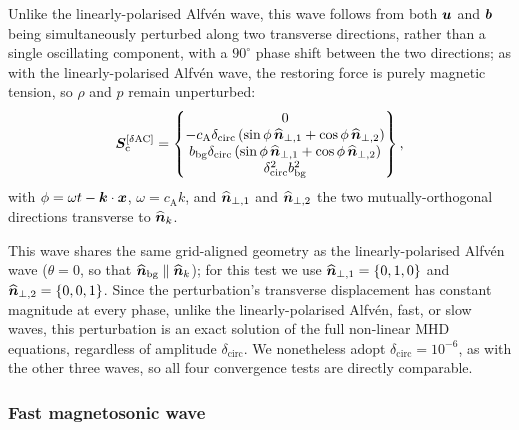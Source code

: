 Unlike the linearly-polarised Alfv\'en wave, this wave follows from both $\bm{u}$ and $\bm{b}$ being simultaneously perturbed along two transverse directions, rather than a single oscillating component, with a $90^\circ$ phase shift between the two directions; as with the linearly-polarised Alfv\'en wave, the restoring force is purely magnetic tension, so $\rho$ and $p$ remain unperturbed:
\begin{align}
    \bm{S}_\mathrm{c}^{[\delta\mathrm{AC}]}
        = \begin{Bmatrix}
            0 \\
            -c_\mathrm{A} \delta_\mathrm{circ} \left( 
                    \sin\phi\, \widehat{\bm{n}}_{\perp,1}
                    + \cos\phi\, \widehat{\bm{n}}_{\perp,2}
                 \right) \\
            b_\mathrm{bg} \delta_\mathrm{circ} \left( 
                    \sin\phi\, \widehat{\bm{n}}_{\perp,1}
                    + \cos\phi\, \widehat{\bm{n}}_{\perp,2}
                 \right) \\
            \delta_\mathrm{circ}^2 b_\mathrm{bg}^2
        \end{Bmatrix}
    ,
\end{align}
with $\phi = \omega t - \bm{k}\cdot\bm{x}$, $\omega = c_\mathrm{A} k$, and $\widehat{\bm{n}}_{\perp,1}$ and $\widehat{\bm{n}}_{\perp,2}$ the two mutually-orthogonal directions transverse to $\widehat{\bm{n}}_{k}$.

This wave shares the same grid-aligned geometry as the linearly-polarised Alfv\'en wave ($\theta = 0$, so that $\widehat{\bm{n}}_\mathrm{bg} \parallel \widehat{\bm{n}}_{k}$); for this test we use $\widehat{\bm{n}}_{\perp,1} = \{0,1,0\}$ and $\widehat{\bm{n}}_{\perp,2} = \{0,0,1\}$. Since the perturbation's transverse displacement has constant magnitude at every phase, unlike the linearly-polarised Alfv\'en, fast, or slow waves, this perturbation is an exact solution of the full non-linear MHD equations, regardless of amplitude $\delta_\mathrm{circ}$. We nonetheless adopt $\delta_\mathrm{circ} = 10^{-6}$, as with the other three waves, so all four convergence tests are directly comparable.

\subsubsection{Fast magnetosonic wave}
\label{sec:scheme-comparison:waves:fast}

